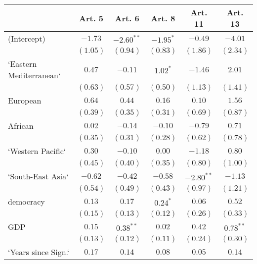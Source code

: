 
\begin{table}[!h]
\begin{center}
\begin{tabular}{l c c c c c }
\toprule
 & Art. 5 & Art. 6 & Art. 8 & Art. 11 & Art. 13 \\
\midrule
(Intercept)             & $-1.73$      & $-2.60^{**}$ & $-1.95^{*}$  & $-0.49$      & $-4.01$      \\
                        & $(1.05)$     & $(0.94)$     & $(0.83)$     & $(1.86)$     & $(2.34)$     \\
`Eastern Mediterranean` & $0.47$       & $-0.11$      & $1.02^{*}$   & $-1.46$      & $2.01$       \\
                        & $(0.63)$     & $(0.57)$     & $(0.50)$     & $(1.13)$     & $(1.41)$     \\
European                & $0.64$       & $0.44$       & $0.16$       & $0.10$       & $1.56$       \\
                        & $(0.39)$     & $(0.35)$     & $(0.31)$     & $(0.69)$     & $(0.87)$     \\
African                 & $0.02$       & $-0.14$      & $-0.10$      & $-0.79$      & $0.71$       \\
                        & $(0.35)$     & $(0.31)$     & $(0.28)$     & $(0.62)$     & $(0.78)$     \\
`Western Pacific`       & $0.30$       & $-0.10$      & $0.00$       & $-1.18$      & $0.80$       \\
                        & $(0.45)$     & $(0.40)$     & $(0.35)$     & $(0.80)$     & $(1.00)$     \\
`South-East Asia`       & $-0.62$      & $-0.42$      & $-0.58$      & $-2.80^{**}$ & $-1.13$      \\
                        & $(0.54)$     & $(0.49)$     & $(0.43)$     & $(0.97)$     & $(1.21)$     \\
democracy               & $0.13$       & $0.17$       & $0.24^{*}$   & $0.06$       & $0.52$       \\
                        & $(0.15)$     & $(0.13)$     & $(0.12)$     & $(0.26)$     & $(0.33)$     \\
GDP                     & $0.15$       & $0.38^{**}$  & $0.02$       & $0.42$       & $0.78^{**}$  \\
                        & $(0.13)$     & $(0.12)$     & $(0.11)$     & $(0.24)$     & $(0.30)$     \\
`Years since Sign.`     & $0.17$       & $0.14$       & $0.08$       & $0.05$       & $0.14$       \\

\end{tabular}
\end{center}
\end{table}
